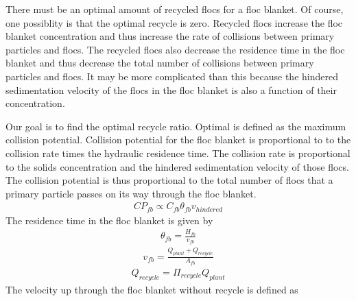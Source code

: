 \documentclass[letterpaper,10pt,english]{sphinxmanual}
\begin{document}
There must be an optimal amount of recycled flocs for a floc blanket. Of course, one possiblity is that the optimal recycle is zero. Recycled flocs increase the floc blanket concentration and thus increase the rate of collisions between primary particles and flocs. The recycled flocs also decrease the residence time in the floc blanket and thus decrease the total number of collisions between primary particles and flocs. It may be more complicated than this because the hindered sedimentation velocity of the flocs in the floc blanket is also a function of their concentration.

Our goal is to find the optimal recycle ratio. Optimal is defined as the maximum collision potential. Collision potential for the floc blanket is proportional to to the collision rate times the hydraulic residence time. The collision rate is proportional to the solids concentration and the hindered sedimentation velocity of those flocs. The collision potential is thus proportional to the total number of flocs that a primary particle passes on its way through the floc blanket.
\begin{equation}\label{equation:Sedimentation/Sed_Theory_and_Future_Work:Sedimentation/Sed_Theory_and_Future_Work:0}
\begin{split}CP_{fb} \propto C_{fb} \theta_{fb} v_{hindered}\end{split}
\end{equation}
The residence time in the floc blanket is given by
\begin{equation}\label{equation:Sedimentation/Sed_Theory_and_Future_Work:Sedimentation/Sed_Theory_and_Future_Work:1}
\begin{split}\theta_{fb} = \frac{H_{fb}}{v_{fb}}\end{split}
\end{equation}\begin{equation}\label{equation:Sedimentation/Sed_Theory_and_Future_Work:Sedimentation/Sed_Theory_and_Future_Work:2}
\begin{split}v_{fb} = \frac{Q_{plant} + Q_{recycle}}{A_{fb}}\end{split}
\end{equation}\begin{equation}\label{equation:Sedimentation/Sed_Theory_and_Future_Work:Sedimentation/Sed_Theory_and_Future_Work:3}
\begin{split}Q_{recycle} = \Pi_{recycle}Q_{plant}\end{split}
\end{equation}
The velocity up through the floc blanket without recycle is defined as
\end{document}
